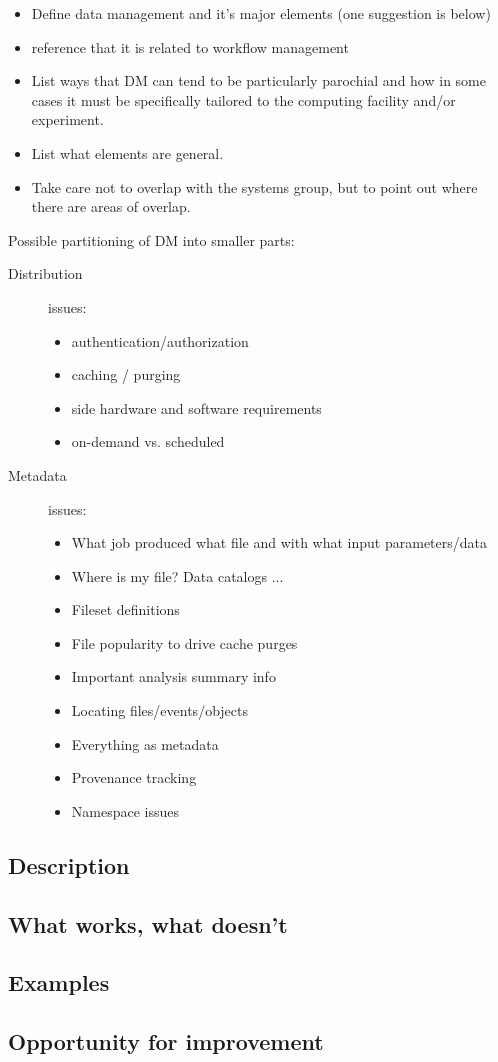 \begin{itemize}
\item Define data management and it's major elements (one suggestion is below)
\item reference that it is related to workflow management
\item List ways that DM can tend to be particularly parochial and how in some cases it must be specifically tailored to the computing facility and/or experiment.
\item List what elements are general.
\item Take care not to overlap with the systems group, but to point out where there are areas of overlap.
\end{itemize}
Possible partitioning of DM into smaller parts:
\begin{description}
\item[Distribution] issues:
  \begin{itemize}
  \item authentication/authorization
  \item caching / purging
  \item side hardware and software requirements
  \item on-demand vs. scheduled
  \end{itemize}
\item[Metadata] issues:
  \begin{itemize}
  \item What job produced what file and with what input parameters/data
  \item Where is my file? Data catalogs ...
  \item Fileset definitions
  \item File popularity to drive cache purges
  \item Important analysis summary info
  \item Locating files/events/objects
  \item Everything as metadata
  \item Provenance tracking
  \item Namespace issues
  \end{itemize}
\end{description}



\subsection{Description}
\subsection{What works, what doesn't}
\subsection{Examples}
\subsection{Opportunity for improvement}
